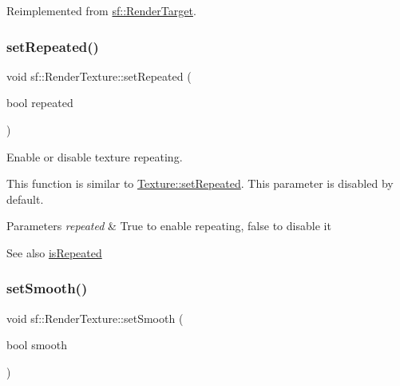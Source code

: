 Reimplemented from \mbox{\hyperlink{classsf_1_1_render_target_adc225ead22a70843ffa9b7eebefa0ce1}{sf\+::\+Render\+Target}}.

\mbox{\label{classsf_1_1_render_texture_af8f97b33512bf7d5b6be3da6f65f7365}} 
\subsubsection{\texorpdfstring{setRepeated()}{setRepeated()}}
{\footnotesize\ttfamily void sf\+::\+Render\+Texture\+::set\+Repeated (\begin{DoxyParamCaption}\item[{bool}]{repeated }\end{DoxyParamCaption})}



Enable or disable texture repeating. 

This function is similar to \mbox{\hyperlink{classsf_1_1_texture_aaa87d1eff053b9d4d34a24c784a28658}{Texture\+::set\+Repeated}}. This parameter is disabled by default.


\begin{DoxyParams}{Parameters}
{\em repeated} & True to enable repeating, false to disable it\\
\hline
\end{DoxyParams}
\begin{DoxySeeAlso}{See also}
\mbox{\hyperlink{classsf_1_1_render_texture_a81c5a453a21c7e78299b062b97dc8c87}{is\+Repeated}} \begin{DoxyVerb}\end{DoxyVerb}
 
\end{DoxySeeAlso}
\mbox{\label{classsf_1_1_render_texture_af08991e63c6020865dd07b20e27305b6}} 
\subsubsection{\texorpdfstring{setSmooth()}{setSmooth()}}
{\footnotesize\ttfamily void sf\+::\+Render\+Texture\+::set\+Smooth (\begin{DoxyParamCaption}\item[{bool}]{smooth }\end{DoxyParamCaption})}



